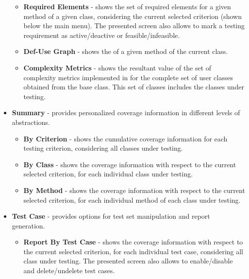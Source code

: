 \begin{itemize}
\begin{itemize}
            \item \textbf{Required Elements} - shows the set of required elements
            for a given method of a given class, considering the current selected
            criterion (shown below the main menu). The presented
            screen also allows to mark a testing requirement as active/deactive or
            feasible/infeasible.

            \item \textbf{Def-Use Graph} - shows the \DUG
            of a given method of the current class.

            \item \textbf{Complexity Metrics} - shows the resultant value of
            the set of complexity metrics implemented in \toolname for the
            complete set of user classes obtained from the base class.
            This set of classes includes the classes under testing.
        \end{itemize}

    \item \textbf{Summary} - provides personalized coverage information
        in different levels of abstractions.
        \begin{itemize}
            \item \textbf{By Criterion} - shows the cumulative coverage
            information for each testing criterion, considering all classes
            under testing.

            \item \textbf{By Class} - shows the coverage
            information with respect to the current selected criterion,
            for each individual class under testing.

            \item \textbf{By Method} - shows the coverage
            information with respect to the current selected criterion,
            for each individual method of each class under testing.
        \end{itemize}

    \item \textbf{Test Case} - provides options for test set
    manipulation and report generation.
        \begin{itemize}
            \item \textbf{Report By Test Case} - shows the coverage
            information with respect to the current selected criterion,
            for each individual test case, considering all class under
            testing. The presented screen also allows to enable/disable and
            delete/undelete test cases.


\end{itemize}
\end{itemize}
